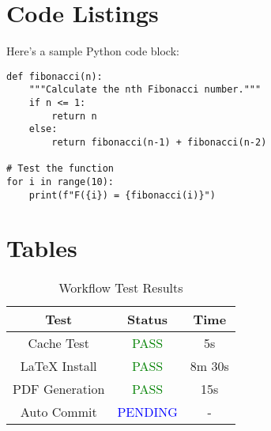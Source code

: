 \documentclass[12pt,a4paper]{article}
\begin{document}
\section{Code Listings}

Here's a sample Python code block:

\begin{lstlisting}[caption={Sample Python Code}]
def fibonacci(n):
    """Calculate the nth Fibonacci number."""
    if n <= 1:
        return n
    else:
        return fibonacci(n-1) + fibonacci(n-2)

# Test the function
for i in range(10):
    print(f"F({i}) = {fibonacci(i)}")
\end{lstlisting}

\section{Tables}

\begin{table}[h]
\centering
\begin{tabular}{|c|c|c|}
\hline
\textbf{Test} & \textbf{Status} & \textbf{Time} \\
\hline
Cache Test & \textcolor{green}{PASS} & 5s \\
LaTeX Install & \textcolor{green}{PASS} & 8m 30s \\
PDF Generation & \textcolor{green}{PASS} & 15s \\
Auto Commit & \textcolor{blue}{PENDING} & - \\
\hline
\end{tabular}
\caption{Workflow Test Results}
\label{tab:results}
\end{table}
\end{document}
